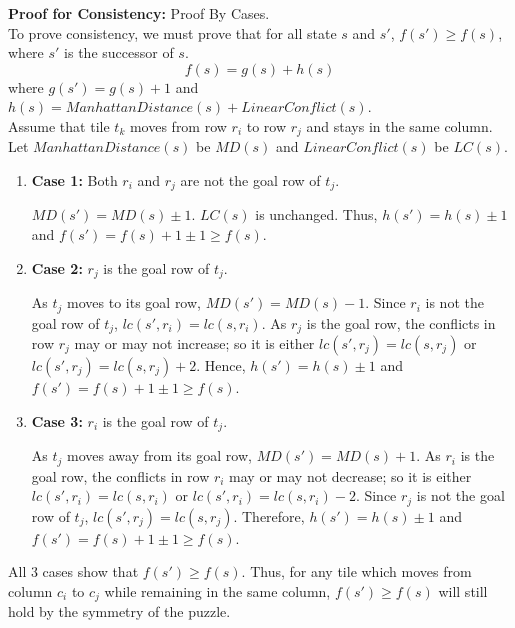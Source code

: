 \documentclass[runningheads]{llncs}
\begin{document}
\textbf{Proof for Consistency:} Proof By Cases. \\
    To prove consistency, we must prove that for all state \( s \) and \( s' \), \( f(s') \geq f(s) \), where \( s' \) is the successor of \( s \).
\[
    f(s) = g(s) + h(s)
\]
where $g(s') = g(s) + 1$ and $h(s) = ManhattanDistance(s) + LinearConflict(s)$. \\
Assume that tile \( t_k \) moves from row \( r_i \) to row \( r_j \) and stays in the same column. Let \( ManhattanDistance(s) \) be \( MD(s) \) and \( LinearConflict(s) \) be \( LC(s) \). 
\begin{enumerate}
    \item \textbf{Case 1:} Both \( r_i \) and \( r_j \) are not the goal row of \( t_j \).
    
        \( MD(s') = MD(s) \pm 1 \). \( LC(s) \) is unchanged. Thus, \( h(s') = h(s) \pm 1 \) and \( f(s') = f(s) + 1 \pm 1 \geq f(s) \).
    
    \item \textbf{Case 2:} \( r_j \) is the goal row of \( t_j \).
        
        As \( t_j \) moves to its goal row, \( MD(s') = MD(s) - 1 \). Since \( r_i \) is not the goal row of \( t_j \), \( lc(s', r_i) = lc(s, r_i) \). 
        As \( r_j \) is the goal row, the conflicts in row \( r_j \) may or may not increase; so it is either \( lc(s', r_j) = lc(s, r_j) \) or \( lc(s', r_j) = lc(s, r_j) + 2 \). 
        Hence, \( h(s') = h(s) \pm 1 \) and \( f(s') = f(s) + 1 \pm 1 \geq f(s) \).

    \item \textbf{Case 3:} \( r_i \) is the goal row of \( t_j \).
    
        As \( t_j \) moves away from its goal row, \( MD(s') = MD(s) + 1 \). 
        As \( r_i \) is the goal row, the conflicts in row \( r_i \) may or may not decrease; so it is either \( lc(s', r_i) = lc(s, r_i) \) or \( lc(s', r_i) = lc(s, r_i) - 2 \). 
        Since \( r_j \) is not the goal row of \( t_j \), \( lc(s', r_j) = lc(s, r_j) \). 
        Therefore, \( h(s') = h(s) \pm 1 \) and \( f(s') = f(s) + 1 \pm 1 \geq f(s) \).
\end{enumerate}
All 3 cases show that \( f(s') \geq f(s) \). Thus, for any tile which moves from column \( c_i \) to \( c_j \) while remaining in the same column, \( f(s') \geq f(s) \) will still hold by the symmetry of the puzzle.
\end{document}
